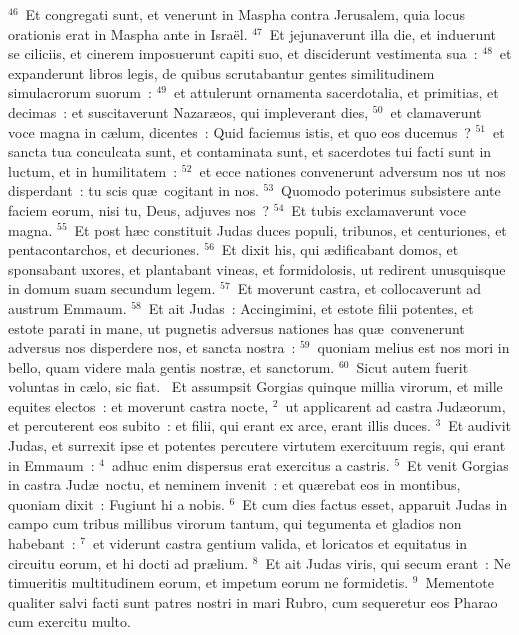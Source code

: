 ${}^{46}$~Et congregati sunt, et venerunt in Maspha contra Jerusalem, quia locus orationis erat in Maspha ante in Isra\"el.
${}^{47}$~Et jejunaverunt illa die, et induerunt se ciliciis, et cinerem imposuerunt capiti suo, et disciderunt vestimenta sua~:
${}^{48}$~et expanderunt libros legis, de quibus scrutabantur gentes similitudinem simulacrorum suorum~:
${}^{49}$~et attulerunt ornamenta sacerdotalia, et primitias, et decimas~: et suscitaverunt Nazar\ae os, qui impleverant dies,
${}^{50}$~et clamaverunt voce magna in c\ae lum, dicentes~: Quid faciemus istis, et quo eos ducemus~?
${}^{51}$~et sancta tua conculcata sunt, et contaminata sunt, et sacerdotes tui facti sunt in luctum, et in humilitatem~:
${}^{52}$~et ecce nationes convenerunt adversum nos ut nos disperdant~: tu scis qu\ae\ cogitant in nos.
${}^{53}$~Quomodo poterimus subsistere ante faciem eorum, nisi tu, Deus, adjuves nos~?
${}^{54}$~Et tubis exclamaverunt voce magna.
${}^{55}$~Et post h\ae c constituit Judas duces populi, tribunos, et centuriones, et pentacontarchos, et decuriones.
${}^{56}$~Et dixit his, qui \ae dificabant domos, et sponsabant uxores, et plantabant vineas, et formidolosis, ut redirent unusquisque in domum suam secundum legem.
${}^{57}$~Et moverunt castra, et collocaverunt ad austrum Emmaum.
${}^{58}$~Et ait Judas~: Accingimini, et estote filii potentes, et estote parati in mane, ut pugnetis adversus nationes has qu\ae\ convenerunt adversus nos disperdere nos, et sancta nostra~:
${}^{59}$~quoniam melius est nos mori in bello, quam videre mala gentis nostr\ae , et sanctorum.
${}^{60}$~Sicut autem fuerit voluntas in c\ae lo, sic fiat.
~Et assumpsit Gorgias quinque millia virorum, et mille equites electos~: et moverunt castra nocte,
${}^{2}$~ut applicarent ad castra Jud\ae orum, et percuterent eos subito~: et filii, qui erant ex arce, erant illis duces.
${}^{3}$~Et audivit Judas, et surrexit ipse et potentes percutere virtutem exercituum regis, qui erant in Emmaum~:
${}^{4}$~adhuc enim dispersus erat exercitus a castris.
${}^{5}$~Et venit Gorgias in castra Jud\ae\ noctu, et neminem invenit~: et qu\ae rebat eos in montibus, quoniam dixit~: Fugiunt hi a nobis.
${}^{6}$~Et cum dies factus esset, apparuit Judas in campo cum tribus millibus virorum tantum, qui tegumenta et gladios non habebant~:
${}^{7}$~et viderunt castra gentium valida, et loricatos et equitatus in circuitu eorum, et hi docti ad pr\ae lium.
${}^{8}$~Et ait Judas viris, qui secum erant~: Ne timueritis multitudinem eorum, et impetum eorum ne formidetis.
${}^{9}$~Mementote qualiter salvi facti sunt patres nostri in mari Rubro, cum sequeretur eos Pharao cum exercitu multo.

